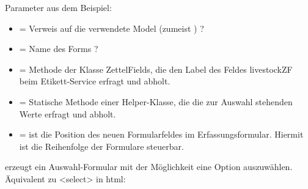 \documentclass[letterpaper,10pt,ngerman]{sphinxmanual}
\begin{document}
Parameter aus dem Beispiel:
\begin{itemize}
\item {} 
 = Verweis auf die verwendete Model (zumeist ) ?

\item {} 
 = Name des Forms ?

\item {} 
 = Methode der Klasse ZettelFields, die den Label des Feldes livestockZF beim Etikett-Service erfragt und abholt.

\item {} 
 = Statische Methode einer Helper-Klasse, die die zur Auswahl stehenden Werte erfragt und abholt.

\item {} 
 = ist die Position des neuen Formularfeldes im Erfassungsformular. Hiermit ist die Reihenfolge der Formulare steuerbar.

\end{itemize}

%
\begin{sphinxVerbatim}[commandchars=\\\{\}]
 
\end{sphinxVerbatim}

 erzeugt ein Auswahl-Formular mit der Möglichkeit eine Option auszuwählen. Äquivalent zu \textless{}select\textgreater{} in html:
\end{document}
